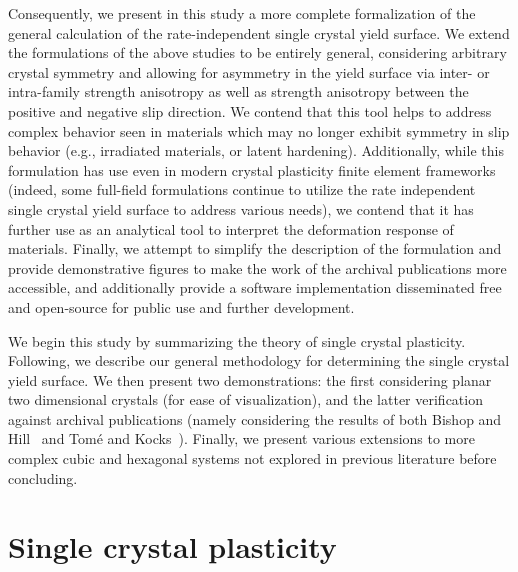 \documentclass[preprint,3p,times,sort&compress,letterpaper,12pt]{elsarticle} %
\begin{document}
Consequently, we present in this study a more complete formalization of the general calculation of the rate-independent single crystal yield surface. We extend the formulations of the above studies to be entirely general, considering arbitrary crystal symmetry and allowing for asymmetry in the yield surface via inter- or intra-family strength anisotropy as well as strength anisotropy between the positive and negative slip direction. We contend that this tool helps to address complex behavior seen in materials which may no longer exhibit symmetry in slip behavior (e.g., irradiated materials, or latent hardening). Additionally, while this formulation has use even in modern crystal plasticity finite element frameworks (indeed, some full-field formulations continue to utilize the rate independent single crystal yield surface to address various needs), we contend that it has further use as an analytical tool to interpret the deformation response of materials. Finally, we attempt to simplify the description of the formulation and provide demonstrative figures to make the work of the archival publications more accessible, and additionally provide a software implementation disseminated free and open-source for public use and further development.

We begin this study by summarizing the theory of single crystal plasticity. Following, we describe our general methodology for determining the single crystal yield surface. We then present two demonstrations: the first considering planar two dimensional crystals (for ease of visualization), and the latter verification against archival publications (namely considering the results of both Bishop and Hill~\cite{Bishop1951} and Tom{\'e} and Kocks~\cite{Tome1985}). Finally, we present various extensions to more complex cubic and hexagonal systems not explored in previous literature before concluding.

\section{Single crystal plasticity}
\label{sec:schmid}
\end{document}
